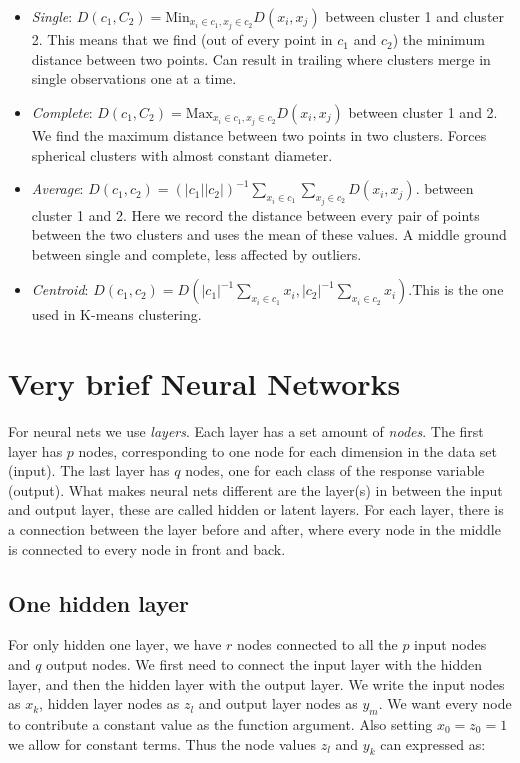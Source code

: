 \documentclass{article}
\begin{document}
\begin{itemize}
    \item \textit{Single}: $D(c_1, C_2) = \text{Min}_{x_i \in c_1, x_j \in c_2} D(x_i, x_j)$ between cluster 1 and cluster 2. This means that we find (out of every point in $c_1$ and $c_2$) the minimum distance between two points. Can result in trailing where clusters merge in single observations one at a time.   
    \item \textit{Complete}: $D(c_1, C_2) = \text{Max}_{x_i \in c_1, x_j \in c_2} D(x_i, x_j)$ between cluster 1 and 2. We find the maximum distance between two points in two clusters. Forces spherical clusters with almost constant diameter.
    \item \textit{Average}: $D(c_1, c_2) = (|c_1| |c_2|)^{-1} \sum_{x_i \in c_1}\sum_{x_j \in c_2} D(x_i,x_j)$. between cluster 1 and 2. Here we record the distance between every pair of points between the two clusters and uses the mean of these values. A middle ground between single and complete, less affected by outliers. 
    \item \textit{Centroid}: $D(c_1,c_2) = D(|c_1|^{-1}\sum_{x_i \in c_1} x_i, |c_2|^{-1}\sum_{x_i \in c_2} x_i)$.This is the one used in K-means clustering.
\end{itemize}

\section{Very brief Neural Networks}
For neural nets we use \textit{layers}. Each layer has a set amount of \textit{nodes}. The first layer has $p$ nodes, corresponding to one node for each dimension in the data set (input). The last layer has $q$ nodes, one for each class of the response variable (output). What makes neural nets different are the layer(s) in between the input and output layer, these are called hidden or latent layers. For each layer, there is a connection between the layer before and after, where every node in the middle is connected to every node in front and back.    

\subsection{One hidden layer}
For only hidden one layer, we have $r$ nodes connected to all the $p$ input nodes and $q$ output nodes. We first need to connect the input layer with the hidden layer, and then the hidden layer with the output layer. We write the input nodes as $x_k$, hidden layer nodes as $z_l$ and output layer nodes as $y_m$. We want every node to contribute a constant value as the function argument. Also setting $x_0 = z_0 = 1$ we allow for constant terms. Thus the node values $z_l$ and $y_k$ can expressed as:
\end{document}
